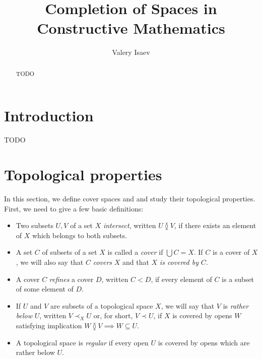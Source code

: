\documentclass[reqno]{amsart}
\theoremstyle{definition}
\theoremstyle{remark}
\numberwithin{figure}{section}
\newcommand{\overlap}[2]{#1 \between #2}
\newcommand{\refines}{<}
\newcommand{\rb}{\prec}
\begin{document}
\title{Completion of Spaces in Constructive Mathematics}

\author{Valery Isaev}

\begin{abstract}
TODO
\end{abstract}

\maketitle

\section{Introduction}

TODO

\section{Topological properties}

In this section, we define cover spaces and and study their topological properties.
First, we need to give a few basic definitions:
\begin{itemize}
\item Two subsets $U,V$ of a set $X$ \emph{intersect}, written $\overlap{U}{V}$, if there exists an element of $X$ which belongs to both subsets.
\item A set $C$ of subsets of a set $X$ is called a \emph{cover} if $\bigcup C = X$. If $C$ is a cover of $X$, we will also say that $C$ \emph{covers} $X$ and that $X$ \emph{is covered by} $C$.
\item A cover $C$ \emph{refines} a cover $D$, written $C \refines D$, if every element of $C$ is a subset of some element of $D$.
\item If $U$ and $V$ are subsets of a topological space $X$, we will say that $V$ is \emph{rather below} $U$, written $V \rb_X U$ or, for short, $V \rb U$, if $X$ is covered by opens $W$ satisfying implication $\overlap{W}{V} \implies W \subseteq U$.
\item A topological space is \emph{regular} if every open $U$ is covered by opens which are rather below $U$.
\end{itemize}
\end{document}
